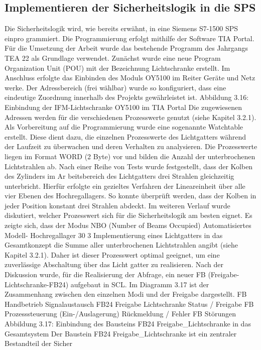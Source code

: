 \subsection{Implementieren der Sicherheitslogik in die SPS}
Die Sicherheitslogik wird, wie bereits erwähnt, in eine Siemens S7-1500 SPS einpro
grammiert. Die Programmierung erfolgt mithilfe der Software TIA Portal.
Für die Umsetzung der Arbeit wurde das bestehende Programm des Jahrgangs TEA
22 als Grundlage verwendet. Zunächst wurde eine neue Program Organization Unit
(POU) mit der Bezeichnung Lichtschranke erstellt.
Im Anschluss erfolgte das Einbinden des Moduls OY5100 im Reiter Geräte und Netz
werke. Der Adressbereich (frei wählbar) wurde so konfiguriert, dass eine eindeutige
Zuordnung innerhalb des Projekts gewährleistet ist.
Abbildung 3.16: Einbindung der IFM-Lichtschranke OY5100 im TIA Portal
Die zugewiesenen Adressen werden für die verschiedenen Prozesswerte genutzt (siehe
Kapitel 3.2.1).
Als Vorbereitung auf die Programmierung wurde eine sogenannte Watchtable erstellt.
Diese dient dazu, die einzelnen Prozesswerte des Lichtgatters während der Laufzeit zu
überwachen und deren Verhalten zu analysieren.
Die Prozesswerte liegen im Format WORD (2 Byte) vor und bilden die Anzahl der
unterbrochenen Lichtstrahlen ab.
Nach einer Reihe von Tests wurde festgestellt, dass der Kolben des Zylinders im Ar
beitsbereich des Lichtgatters drei Strahlen gleichzeitig unterbricht. Hierfür erfolgte
ein gezieltes Verfahren der Lineareinheit über alle vier Ebenen des Hochregallagers.
So konnte überprüft werden, dass der Kolben in jeder Position konstant drei Strahlen
abdeckt.
Im weiteren Verlauf wurde diskutiert, welcher Prozesswert sich für die Sicherheitslogik
am besten eignet. Es zeigte sich, dass der Modus NBO (Number of Beams Occupied)
Automatisiertes Modell- Hochregallager
30
3 Implementierung eines Lichtgatters in das Gesamtkonzept
die Summe aller unterbrochenen Lichtstrahlen angibt (siehe Kapitel 3.2.1). Daher ist
dieser Prozesswert optimal geeignet, um eine zuverlässige Abschaltung über das Licht
gatter zu realisieren.
Nach der Diskussion wurde, für die Realisierung der Abfrage, ein neuer FB (Freigabe-Lichtschranke-FB24) aufgebaut in SCL. Im Diagramm 3.17 ist der Zusammenhang
zwischen den einzelnen Modi und der Freigabe dargestellt.
FB
Handbetrieb
Signalaustausch
FB24
Freigabe
Lichtschranke
Status / Freigabe
FB
Prozesssteuerung
(Ein-/Auslagerung)
Rückmeldung / Fehler
FB
Störungen
Abbildung 3.17: Einbindung des Bausteins FB24 Freigabe\_Lichtschranke in das
Gesamtsystem
Der Baustein FB24 Freigabe\_Lichtschranke ist ein zentraler Bestandteil der Sicher
